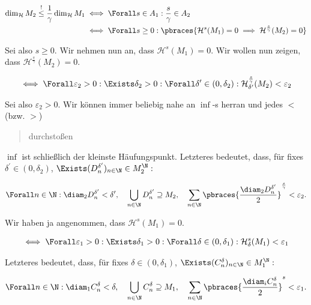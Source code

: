\begin{solution}
\begin{align*}
    \dim_\mathcal{H} M_2
    \stackrel{!}{\leq}
    \frac{1}{\gamma}
    \dim_\mathcal{H} M_1
    & \iff
    \Forall s \in A_1:
        \frac{s}{\gamma} \in A_2 \\
    & \iff
    \Forall s \geq 0:
        \pbraces
        {
            \mathcal{H}^s(M_1) = 0
            \implies
            \mathcal{H}^\frac{s}{\gamma}(M_2) = 0
        }
\end{align*}

Sei also $s \geq 0$.
Wir nehmen nun an, dass $\mathcal{H}^s(M_1) = 0$.
Wir wollen nun zeigen, dass $\mathcal{H}^\frac{s}{\gamma}(M_2) = 0$.

\begin{align*}
    \iff
    \Forall \varepsilon_2 > 0:
    \Exists \delta_2 > 0:
    \Forall \delta^\prime \in (0, \delta_2):
        \mathcal{H}_{\delta^\prime}^\frac{s}{\gamma}(M_2) < \varepsilon_2
\end{align*}

Sei also $\varepsilon_2 > 0$.
Wir können immer beliebig nahe an $\inf$-s herran und jedes $<$ (bzw. $>$) \blockquote{durchstoßen}; $\inf$ ist schließlich der kleinste Häufungspunkt.
Letzteres bedeutet, dass, für fixes $\delta^\prime \in (0, \delta_2)$, $\Exists (D_n^{\delta^\prime})_{n \in \N} \in M_2^\N:$

\begin{align*}
    \Forall n \in \N:
        \diam_2 D_n^{\delta^\prime} < \delta^\prime,
    \quad
    \bigcup_{n \in \N}
        D_n^{\delta^\prime} \supseteq M_2,
    \quad
    \sum_{n \in \N}
        \pbraces
        {
            \frac{\diam_2 D_n^{\delta^\prime}}{2}
        }^\frac{s}{\gamma}
        <
        \varepsilon_2.
\end{align*}

Wir haben ja angenommen, dass $\mathcal{H}^s(M_1) = 0$.

\begin{align*}    
    \iff
    \Forall \varepsilon_1 > 0:
    \Exists \delta_1 > 0:
    \Forall \delta \in (0, \delta_1):
    \mathcal{H}_\delta^s(M_1) < \varepsilon_1
\end{align*}

Letzteres bedeutet, dass, für fixes $\delta \in (0, \delta_1)$, $\Exists (C_n^\delta)_{n \in \N} \in M_1^\N:$

\begin{align*}
    \Forall n \in \N:
        \diam_1 C_n^\delta < \delta,
    \quad
    \bigcup_{n \in \N} C_n^\delta \supseteq M_1,
    \quad
    \sum_{n \in \N} \pbraces{\frac{\diam_i C_n^\delta}{2}}^s < \varepsilon_1.
\end{align*}


\end{solution}
